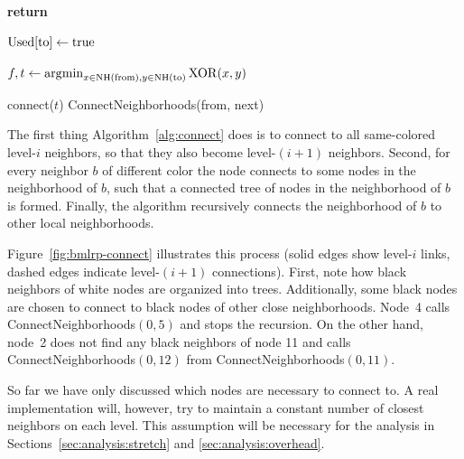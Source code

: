 \documentclass[conference]{IEEEtran}
\theoremstyle{definition}
\DeclareMathOperator*{\argmin}{\arg\!\min}
\newcommand{\cN}{{\mathcal{N}}}
\begin{document}
\begin{algorithm}
    \begin{algorithmic}[1]
        
                \State \textbf{return}      %
            \EndIf
                
            \State ${\rm Used}[{\rm to}] \gets {\rm true}$

                \State $f, t \gets \argmin_{x \in {\rm NH}({\rm from}), y \in {\rm NH}({\rm to})}{\rm XOR}(x, y)$

                    \State connect($t$)
                \EndIf
            \Else
                \For {${\rm next} \in \cN({\rm to}) \setminus {\rm NH}({\rm to})$}
                    \State ConnectNeighborhoods(from, next)
                \EndFor
            \EndIf

        \EndProcedure
    \end{algorithmic}
\end{algorithm}

The first thing Algorithm~\ref{alg:connect} does is to connect to all same-colored level-$i$ neighbors, so that they also become level-$(i+1)$ neighbors. Second, for every neighbor $b$ of different color the node connects to some nodes in the neighborhood of $b$, such that a connected tree of nodes in the neighborhood of $b$ is formed. Finally, the algorithm recursively connects the neighborhood of $b$ to other local neighborhoods.

Figure~\ref{fig:bmlrp-connect} illustrates this process (solid edges show 
level-$i$ links, dashed edges indicate level-$(i+1)$ connections). First, note how black neighbors of white nodes are organized into trees. Additionally, some black nodes are chosen to connect to black nodes of other close neighborhoods. Node~4 calls ConnectNeighborhoods$(0, 5)$ and stops the recursion. On the other hand, node~2 does not find any black neighbors of node 11 and 
calls ConnectNeighborhoods$(0, 12)$ from ConnectNeighborhoods$(0, 11)$.



So far we have only discussed which nodes are necessary to connect to. A real implementation will, however, try to maintain a constant number of closest neighbors on each level. This assumption will be necessary for 
the analysis in Sections~\ref{sec:analysis:stretch} and \ref{sec:analysis:overhead}.
\end{document}
